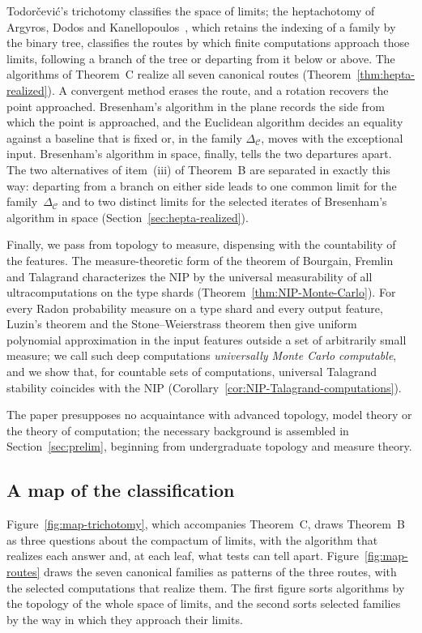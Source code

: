 \documentclass[psamsfonts]{amsart}
\theoremstyle{definition}
\theoremstyle{remark}
\numberwithin{equation}{section}
\begin{document}
Todorčević's trichotomy classifies the space of limits; the heptachotomy of Argyros, Dodos and Kanellopoulos~\cite{argyros2008rosenthal}, which retains the indexing of a family by the binary tree, classifies the routes by which finite computations approach those limits, following a branch of the tree or departing from it below or above.
The algorithms of Theorem~C realize all seven canonical routes (Theorem~\ref{thm:hepta-realized}).
A convergent method erases the route, and a rotation recovers the point approached.
Bresenham's algorithm in the plane records the side from which the point is approached, and the Euclidean algorithm decides an equality against a baseline that is fixed or, in the family $\Delta_{\mathcal{C}}$, moves with the exceptional input.
Bresenham's algorithm in space, finally, tells the two departures apart.
The two alternatives of item~(iii) of Theorem~B are separated in exactly this way: departing from a branch on either side leads to one common limit for the family~$\Delta_{\mathcal{C}}$ and to two distinct limits for the selected iterates of Bresenham's algorithm in space (Section~\ref{sec:hepta-realized}).

Finally, we pass from topology to measure, dispensing with the countability of the features.
The measure-theoretic form of the theorem of Bourgain, Fremlin and Talagrand characterizes the NIP by the universal measurability of all ultracomputations on the type shards (Theorem~\ref{thm:NIP-Monte-Carlo}).
For every Radon probability measure on a type shard and every output feature, Luzin's theorem and the Stone--Weierstrass theorem then give uniform polynomial approximation in the input features outside a set of arbitrarily small measure; we call such deep computations \emph{universally Monte Carlo computable}, and we show that, for countable sets of computations, universal Talagrand stability coincides with the NIP (Corollary~\ref{cor:NIP-Talagrand-computations}).

The paper presupposes no acquaintance with advanced topology, model theory or the theory of computation; the necessary background is assembled in Section~\ref{sec:prelim}, beginning from undergraduate topology and measure theory.

\subsection*{A map of the classification}
Figure~\ref{fig:map-trichotomy}, which accompanies Theorem~C, draws Theorem~B as three questions about the compactum of limits, with the algorithm that realizes each answer and, at each leaf, what tests can tell apart.
Figure~\ref{fig:map-routes} draws the seven canonical families as patterns of the three routes, with the selected computations that realize them.
The first figure sorts algorithms by the topology of the whole space of limits, and the second sorts selected families by the way in which they approach their limits.
\end{document}

